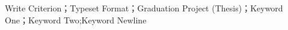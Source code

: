 \begin{enabstract}{Write Criterion；Typeset Format；Graduation Project (Thesis)；Keyword One；Keyword Two;Keyword Newline}
\lipsum[10]
\end{enabstract}


